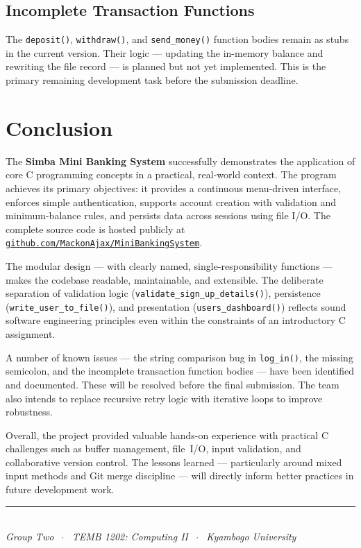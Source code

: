 \documentclass[12pt, a4paper]{article}
\begin{document}
\subsection{Incomplete Transaction Functions}

The \texttt{deposit()}, \texttt{withdraw()}, and \texttt{send\_money()} function bodies
remain as stubs in the current version. Their logic — updating the in-memory balance and
rewriting the file record — is planned but not yet implemented. This is the primary remaining
development task before the submission deadline.

\section{Conclusion}

The \textbf{Simba Mini Banking System} successfully demonstrates the application of core C
programming concepts in a practical, real-world context. The program achieves its primary
objectives: it provides a continuous menu-driven interface, enforces simple authentication,
supports account creation with validation and minimum-balance rules, and persists data
across sessions using file I/O. The complete source code is hosted publicly at
\href{https://github.com/MackonAjax/MiniBankingSystem/blob/main/main.c}{\texttt{github.com/MackonAjax/MiniBankingSystem}}.

The modular design — with clearly named, single-responsibility functions — makes the
codebase readable, maintainable, and extensible. The deliberate separation of validation
logic (\texttt{validate\_sign\_up\_details()}), persistence
(\texttt{write\_user\_to\_file()}), and presentation (\texttt{users\_dashboard()}) reflects
sound software engineering principles even within the constraints of an introductory C
assignment.

A number of known issues — the string comparison bug in \texttt{log\_in()}, the missing
semicolon, and the incomplete transaction function bodies — have been identified and
documented. These will be resolved before the final submission. The team also intends to
replace recursive retry logic with iterative loops to improve robustness.

Overall, the project provided valuable hands-on experience with practical C challenges
such as buffer management, file~I/O, input validation, and collaborative version control.
The lessons learned — particularly around mixed input methods and Git merge discipline —
will directly inform better practices in future development work.

\vspace{1.5cm}
\begin{center}
    \textcolor{black}{\rule{10cm}{1pt}}\\[0.4cm]
    {\small\itshape Group Two $\;\cdot\;$ TEMB 1202: Computing II $\;\cdot\;$
    Kyambogo University}
\end{center}
\end{document}
